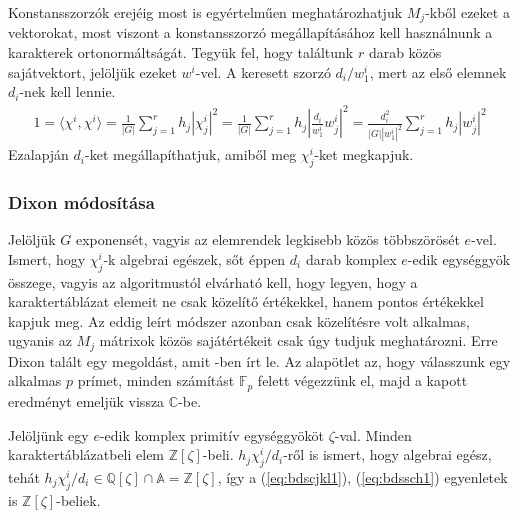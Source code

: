 Konstansszorzók erejéig most is egyértelműen meghatározhatjuk $M_j$-kből ezeket a vektorokat, most viszont a konstansszorzó megállapításához
kell használnunk a karakterek ortonormáltságát. Tegyük fel, hogy találtunk $r$ darab közös sajátvektort, jelöljük ezeket $w^i$-vel.
A keresett szorzó $d_i/w^i_1$, mert az első elemnek $d_i$-nek kell lennie.
\begin{align}
\label{eq:bdssch2}
1 = \langle \chi^i, \chi^i \rangle = \frac{1}{|G|}\sum_{j=1}^r h_j |\chi^i_j|^2 = \frac{1}{|G|}\sum_{j=1}^r h_j \left|\frac{d_i}{w^i_1} w^i_j\right|^2 = 
\frac{d_i^2}{|G| |w^i_1|^2} \sum_{j=1}^r h_j |w^i_j|^2
\end{align}
Ezalapján $d_i$-ket megállapíthatjuk, amiből meg $\chi^i_j$-ket megkapjuk.


\subsubsection{Dixon módosítása}
\label{subsubsec:bdsdixon}
Jelöljük $G$ exponensét, vagyis az elemrendek legkisebb közös többszörösét $e$-vel.
Ismert, hogy $\chi^i_j$-k algebrai egészek, sőt éppen $d_i$ darab komplex $e$-edik egységgyök összege,
vagyis az algoritmustól elvárható kell, hogy legyen, hogy a karaktertáblázat elemeit ne csak közelítő értékekkel, hanem pontos értékekkel kapjuk meg.
Az eddig leírt módszer azonban csak közelítésre volt alkalmas, ugyanis az $M_j$ mátrixok közös sajátértékeit csak úgy tudjuk meghatározni.
Erre Dixon talált egy megoldást, amit \cite{Dix67}-ben írt le. Az alapötlet az, hogy válasszunk egy alkalmas $p$ prímet, minden számítást $\mathbb{F}_p$
felett végezzünk el, majd a kapott eredményt emeljük vissza $\mathbb{C}$-be.

Jelöljünk egy $e$-edik komplex primitív egységgyököt $\zeta$-val. Minden karaktertáblázatbeli elem $\mathbb{Z}[\zeta]$-beli.
$h_j\chi^i_j/d_i$-ről is ismert, hogy algebrai egész, tehát $h_j\chi^i_j/d_i \in \mathbb{Q}[\zeta] \cap \mathbb{A} = \mathbb{Z}[\zeta]$, így a
(\ref{eq:bdscjkl1}), (\ref{eq:bdssch1}) egyenletek is $\mathbb{Z}[\zeta]$-beliek.

